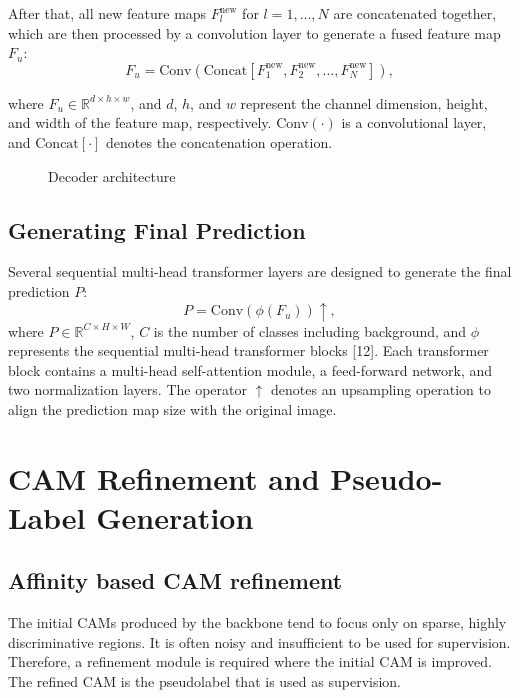 After that, all new feature maps \( F_l^{\text{new}} \) for \( l = 1, \dots, N \) are concatenated together, which are then processed by a convolution layer to generate a fused feature map \( F_u \):
\begin{equation}
    F_u = \text{Conv}\left( \text{Concat}\left[ F_1^{\text{new}}, F_2^{\text{new}}, \dots, F_N^{\text{new}} \right] \right),
    \tag{2}
\end{equation}

where \( F_u \in \mathbb{R}^{d \times h \times w} \), and \( d \), \( h \), and \( w \) represent the channel dimension, height, and width of the feature map, respectively. \(\text{Conv}(\cdot)\) is a convolutional layer, and \(\text{Concat}[\cdot]\) denotes the concatenation operation.


\begin{figure}[t]
    \centering
    \caption{Decoder architecture}
    \label{fig:decoder}
\end{figure}

\subsection{Generating Final Prediction}
\label{subsec:decoder_final_pred}

Several sequential multi-head transformer layers are designed to generate the final prediction \( P \):
\begin{equation}
    \label{eq:prediction}
    P = \text{Conv}(\phi(F_u)) \uparrow,
\end{equation}
where \( P \in \mathbb{R}^{C \times H \times W} \), \( C \) is the number of classes including background, and \(\phi\) represents the sequential multi-head transformer blocks [12]. Each transformer block contains a multi-head self-attention module, a feed-forward network, and two normalization layers. The operator \(\uparrow\) denotes an upsampling operation to align the prediction map size with the original image.


\section{CAM Refinement and Pseudo-Label Generation}
\label{sec:refinement}
\subsection{Affinity based CAM refinement}
The initial CAMs produced by the backbone tend to focus only on sparse, highly discriminative regions. It is often noisy and insufficient to be used for supervision. Therefore, a refinement module is required where the initial CAM is improved. The refined CAM is the pseudolabel that is used as supervision.

